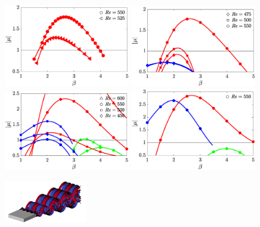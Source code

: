 \begin{figure}
  \centering
%  
%  
%    
%  
  \includegraphics[width=0.49\textwidth]{./fig/AR5s/multipliers_AR5.eps}
  \includegraphics[width=0.49\textwidth]{./fig/AR5s/multipliers_AR5p25.eps}  
  \includegraphics[width=0.49\textwidth]{./fig/AR5s/multipliers_AR5p5.eps}  
  \includegraphics[width=0.49\textwidth]{./fig/AR5s/multipliers_AR5p75.eps}      
  \vspace{0.1cm}
  \vspace{0.1cm}
  \includegraphics[width=0.32\textwidth]{./fig/AR5s/Floqetmode_beta_2_Re550_AR5p5_A.png}

\end{figure}
